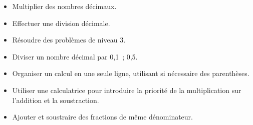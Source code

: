 \documentclass[a4paper,12pt,fleqn]{article}	
\begin{document}
\begin{itemize}
	\item {}Multiplier des nombres décimaux.
	\item {}Effectuer une division décimale.
	\item {}Résoudre des problèmes de niveau 3.
	\item {}Diviser un nombre décimal par 0,1 ; 0,5.
	\item {}Organiser un calcul en une seule ligne, utilisant si nécessaire des parenthèses.
	\item {}Utiliser une calculatrice pour introduire la priorité de la multiplication sur l’addition et la soustraction.
	\item {}Ajouter et soustraire des fractions de même dénominateur.

\end{itemize}


	
\end{document}
